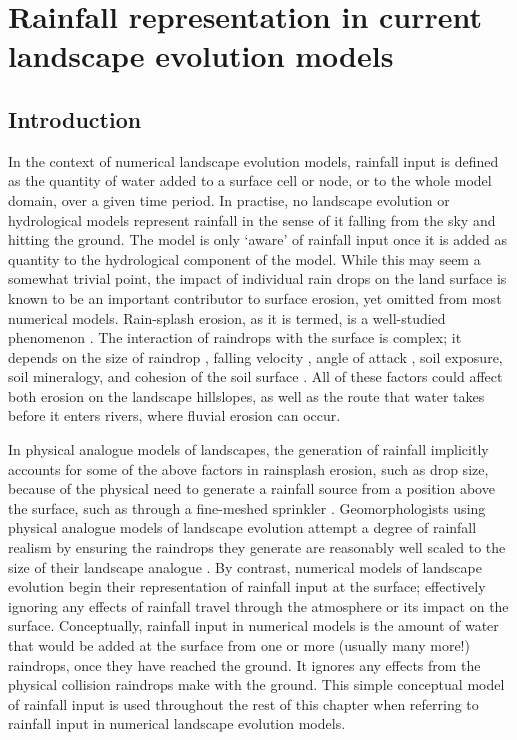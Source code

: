 \chapter{Rainfall representation in current landscape evolution models}
\label{chapter_RainfallInLEMs}

\section{Introduction}
In the context of numerical landscape evolution models, rainfall input is defined as the quantity of water added to a surface cell or node, or to the whole model domain, over a given time period. In practise, no landscape evolution or hydrological models represent rainfall in the sense of it falling from the sky and hitting the ground. The model is only `aware' of rainfall input once it is added as quantity to the hydrological component of the model.  While this may seem a somewhat trivial point, the impact of individual rain drops on the land surface is known to be an important contributor to surface erosion, yet omitted from most numerical models. Rain-splash erosion, as it is termed, is a well-studied phenomenon \citep{morgan1978field, meyer1981rain}. The interaction of raindrops with the surface is complex; it depends on the size of raindrop \citep{morgan1998european}, falling velocity \citep{park1983rainfall}, angle of attack \citep{pedersen1995influence}, soil exposure, soil mineralogy, and cohesion of the soil surface \citep{luk1979effect}. All of these factors could affect both erosion on the landscape hillslopes, as well as the route that water takes before it enters rivers, where fluvial erosion can occur. 

In physical analogue models of landscapes, the generation of rainfall implicitly accounts for some of the above factors in rainsplash erosion, such as drop size, because of the physical need to generate a rainfall source from a position above the surface, such as through a fine-meshed sprinkler \citep[e.g.][]{hancock2001use}. Geomorphologists using physical analogue models of landscape evolution attempt a degree of rainfall realism by ensuring the raindrops they generate are reasonably well scaled to the size of their landscape analogue \citep{meyer1994rainfall}. By contrast, numerical models of landscape evolution begin their representation of rainfall input at the surface; effectively ignoring any effects of rainfall travel through the atmosphere or its impact on the surface. Conceptually, rainfall input in numerical models is the amount of water that would be added at the surface from one or more (usually many more!) raindrops, once they have reached the ground. It ignores any effects from the physical collision raindrops make with the ground. This simple conceptual model of rainfall input is used throughout the rest of this chapter when referring to rainfall input in numerical landscape evolution models.

